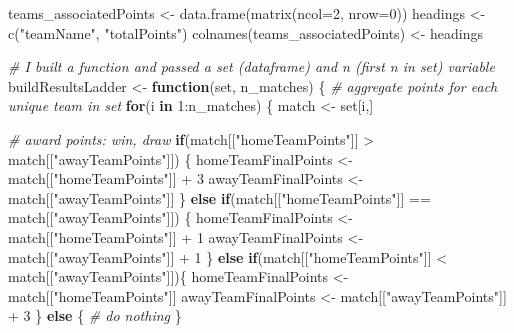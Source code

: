 \documentclass[
]{article}
\newenvironment{Shaded}{\begin{snugshade}}{\end{snugshade}}
\newcommand{\AttributeTok}[1]{\textcolor[rgb]{0.77,0.63,0.00}{#1}}
\newcommand{\CommentTok}[1]{\textcolor[rgb]{0.56,0.35,0.01}{\textit{#1}}}
\newcommand{\ControlFlowTok}[1]{\textcolor[rgb]{0.13,0.29,0.53}{\textbf{#1}}}
\newcommand{\DecValTok}[1]{\textcolor[rgb]{0.00,0.00,0.81}{#1}}
\newcommand{\FunctionTok}[1]{\textcolor[rgb]{0.00,0.00,0.00}{#1}}
\newcommand{\NormalTok}[1]{#1}
\newcommand{\OtherTok}[1]{\textcolor[rgb]{0.56,0.35,0.01}{#1}}
\newcommand{\SpecialCharTok}[1]{\textcolor[rgb]{0.00,0.00,0.00}{#1}}
\newcommand{\StringTok}[1]{\textcolor[rgb]{0.31,0.60,0.02}{#1}}
\begin{document}
\begin{Shaded}
\begin{Highlighting}[]
\NormalTok{teams\_associatedPoints }\OtherTok{\textless{}{-}} \FunctionTok{data.frame}\NormalTok{(}\FunctionTok{matrix}\NormalTok{(}\AttributeTok{ncol=}\DecValTok{2}\NormalTok{, }\AttributeTok{nrow=}\DecValTok{0}\NormalTok{))}
\NormalTok{headings }\OtherTok{\textless{}{-}} \FunctionTok{c}\NormalTok{(}\StringTok{"teamName"}\NormalTok{, }\StringTok{"totalPoints"}\NormalTok{)}
\FunctionTok{colnames}\NormalTok{(teams\_associatedPoints) }\OtherTok{\textless{}{-}}\NormalTok{ headings}

\CommentTok{\# I built a function and passed a set (dataframe) and n (first n in set) variable}
\NormalTok{buildResultsLadder }\OtherTok{\textless{}{-}} \ControlFlowTok{function}\NormalTok{(set, n\_matches) \{}
  \CommentTok{\# aggregate points for each unique team in set}
  \ControlFlowTok{for}\NormalTok{(i }\ControlFlowTok{in} \DecValTok{1}\SpecialCharTok{:}\NormalTok{n\_matches) \{}
\NormalTok{    match }\OtherTok{\textless{}{-}}\NormalTok{ set[i,]}
    
    \CommentTok{\# award points: win, draw}
    \ControlFlowTok{if}\NormalTok{(match[[}\StringTok{"homeTeamPoints"}\NormalTok{]] }\SpecialCharTok{\textgreater{}}\NormalTok{ match[[}\StringTok{"awayTeamPoints"}\NormalTok{]]) \{}
\NormalTok{      homeTeamFinalPoints }\OtherTok{\textless{}{-}}\NormalTok{ match[[}\StringTok{"homeTeamPoints"}\NormalTok{]] }\SpecialCharTok{+} \DecValTok{3}
\NormalTok{      awayTeamFinalPoints }\OtherTok{\textless{}{-}}\NormalTok{ match[[}\StringTok{"awayTeamPoints"}\NormalTok{]]}
\NormalTok{    \} }\ControlFlowTok{else} \ControlFlowTok{if}\NormalTok{(match[[}\StringTok{"homeTeamPoints"}\NormalTok{]] }\SpecialCharTok{==}\NormalTok{ match[[}\StringTok{"awayTeamPoints"}\NormalTok{]]) \{}
\NormalTok{      homeTeamFinalPoints }\OtherTok{\textless{}{-}}\NormalTok{ match[[}\StringTok{"homeTeamPoints"}\NormalTok{]] }\SpecialCharTok{+} \DecValTok{1}
\NormalTok{      awayTeamFinalPoints }\OtherTok{\textless{}{-}}\NormalTok{ match[[}\StringTok{"awayTeamPoints"}\NormalTok{]] }\SpecialCharTok{+} \DecValTok{1}
\NormalTok{    \} }\ControlFlowTok{else} \ControlFlowTok{if}\NormalTok{(match[[}\StringTok{"homeTeamPoints"}\NormalTok{]] }\SpecialCharTok{\textless{}}\NormalTok{ match[[}\StringTok{"awayTeamPoints"}\NormalTok{]])\{}
\NormalTok{      homeTeamFinalPoints }\OtherTok{\textless{}{-}}\NormalTok{ match[[}\StringTok{"homeTeamPoints"}\NormalTok{]]}
\NormalTok{      awayTeamFinalPoints }\OtherTok{\textless{}{-}}\NormalTok{ match[[}\StringTok{"awayTeamPoints"}\NormalTok{]] }\SpecialCharTok{+} \DecValTok{3}
\NormalTok{    \} }\ControlFlowTok{else}\NormalTok{ \{}
      \CommentTok{\# do nothing}
\NormalTok{    \}}
    

\end{Highlighting}
\end{Shaded}
\end{document}
